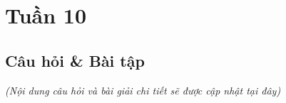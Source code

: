 \section{Tuần 10}
\label{sec:week10}

\subsection{Câu hỏi \& Bài tập}
\textit{(Nội dung câu hỏi và bài giải chi tiết sẽ được cập nhật tại đây)}
